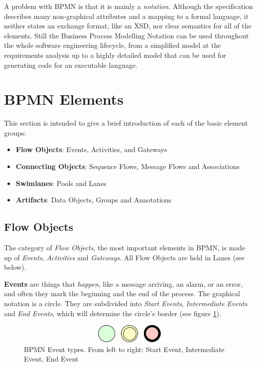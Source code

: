 A problem with BPMN is that it is mainly a \emph{notation}. Although the specification describes
many non-graphical attributes and a mapping to a formal language, it neither states an exchange
format, like an XSD, nor clear semantics for all of the elements. Still the Business Process
Modelling Notation can be used throughout the whole software engineering lifecycle, from a
simplified model at the requirements analysis up to a highly detailed model that can be used for
generating code for an executable language.


\section{BPMN Elements}
\label{sec:bpmn_elements}

This section is intended to give a brief introduction of each of the basic element groups:

\begin{itemize}
	\item \textbf{Flow Objects}: Events, Activities, and Gateways
	\item \textbf{Connecting Objects}: Sequence Flows, Message Flows and Associations
	\item \textbf{Swimlanes}: Pools and Lanes
	\item \textbf{Artifacts}: Data Objects, Groups and Annotations
\end{itemize}

\subsection{Flow Objects}

The category of \emph{Flow Objects}, the most important elements in BPMN, is made up of
\emph{Events}, \emph{Activities} and \emph{Gateways}. All Flow Objects are held in Lanes (see
below).

\textbf{Events} are things that \emph{happen}, like a message arriving, an alarm, or an error, and
often they mark the beginning and the end of the process. The graphical notation is a circle. They
are subdivided into \emph{Start Events}, \emph{Intermediate Events} and \emph{End Events}, which
will determine the circle's border (see figure \ref{fig:events}).

\begin{figure}[ht]
	\centering
	\includegraphics[width=.75\textwidth]{figures/bpmn/events.png}
	\caption[BPMN Event types]{BPMN Event types. From left to right: Start Event, Intermediate
	Event, End Event}
	\label{fig:events}
\end{figure}

